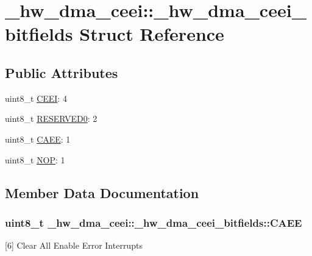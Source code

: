\hypertarget{struct__hw__dma__ceei_1_1__hw__dma__ceei__bitfields}{}\section{\+\_\+hw\+\_\+dma\+\_\+ceei\+:\+:\+\_\+hw\+\_\+dma\+\_\+ceei\+\_\+bitfields Struct Reference}
\label{struct__hw__dma__ceei_1_1__hw__dma__ceei__bitfields}
\subsection*{Public Attributes}
\begin{DoxyCompactItemize}
\item 
uint8\+\_\+t \hyperlink{struct__hw__dma__ceei_1_1__hw__dma__ceei__bitfields_a3fc9d25338f681c97a814159f1aa4c5e}{C\+E\+EI}\+: 4
\item 
uint8\+\_\+t \hyperlink{struct__hw__dma__ceei_1_1__hw__dma__ceei__bitfields_af382b0c1309333e7a7ffc8d566c49640}{R\+E\+S\+E\+R\+V\+E\+D0}\+: 2
\item 
uint8\+\_\+t \hyperlink{struct__hw__dma__ceei_1_1__hw__dma__ceei__bitfields_aee731365b268dbd5b4fa316d9b2ec7f3}{C\+A\+EE}\+: 1
\item 
uint8\+\_\+t \hyperlink{struct__hw__dma__ceei_1_1__hw__dma__ceei__bitfields_ae88b295dc0eae083556e18a17ec9d9ae}{N\+OP}\+: 1
\end{DoxyCompactItemize}


\subsection{Member Data Documentation}
\subsubsection[{\texorpdfstring{C\+A\+EE}{CAEE}}]{\setlength{\rightskip}{0pt plus 5cm}uint8\+\_\+t \+\_\+hw\+\_\+dma\+\_\+ceei\+::\+\_\+hw\+\_\+dma\+\_\+ceei\+\_\+bitfields\+::\+C\+A\+EE}\hypertarget{struct__hw__dma__ceei_1_1__hw__dma__ceei__bitfields_aee731365b268dbd5b4fa316d9b2ec7f3}{}\label{struct__hw__dma__ceei_1_1__hw__dma__ceei__bitfields_aee731365b268dbd5b4fa316d9b2ec7f3}
\mbox{[}6\mbox{]} Clear All Enable Error Interrupts 
